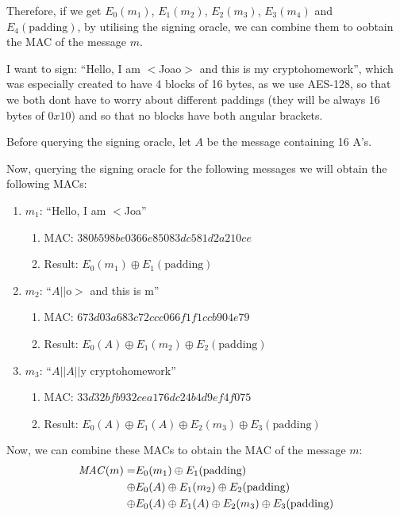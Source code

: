 \documentclass{article}
\begin{document}
Therefore, if we get $E_0(m_1)$, $E_1(m_2)$, $E_2(m_3)$, $E_3(m_4)$ and $E_4(\text{padding})$, by utilising the signing oracle, we can combine them to oobtain the MAC of the message $m$.

I want to sign: ``Hello, I am $<$Joao$>$ and this is my cryptohomework'', which was especially created to have 4 blocks of 16 bytes, as we use AES-128, so that we both dont have to worry about different paddings (they will be always 16 bytes of $0x10$) and so that no blocks have both angular brackets.

Before querying the signing oracle, let $A$ be the message containing 16 A's.

Now, querying the signing oracle for the following messages we will obtain the following MACs:
\begin{enumerate}
    \item $m_1$: ``Hello, I am $<$Joa''
        \begin{enumerate}
            \item MAC: $380b598be0366e85083dc581d2a210ce$
            \item Result: $E_0(m_1) \oplus E_1(\text{padding})$
        \end{enumerate}
    \item $m_2$: ``$A||$o$>$ and this is m''
        \begin{enumerate}
            \item MAC: $673d03a683c72ccc066f1f1ccb904e79$
            \item Result: $E_0(A) \oplus E_1(m_2) \oplus E_2(\text{padding})$
        \end{enumerate}
    \item $m_3$: ``$A||A||$y cryptohomework''
        \begin{enumerate}
            \item MAC: $33d32bfb932cea176dc24b4d9ef4f075$
            \item Result: $E_0(A) \oplus E_1(A) \oplus E_2(m_3) \oplus E_3(\text{padding})$
        \end{enumerate}
\end{enumerate}
Now, we can combine these MACs to obtain the MAC of the message $m$:
\begin{equation}
    \begin{aligned}
        \text{\textit{MAC}}(m) = &E_0(m_1) \oplus E_1(\text{padding}) \\
            \oplus &E_0(A)    \oplus E_1(m_2)            \oplus E_2(\text{padding}) \\
            \oplus &E_0(A)   \oplus E_1(A)              \oplus E_2(m_3)           \oplus E_3(\text{padding}) \\
    \end{aligned}
\end{equation}
\end{document}
